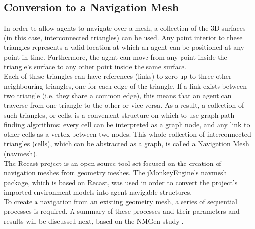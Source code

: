 \subsection{Conversion to a Navigation Mesh}
In order to allow agents to navigate over a mesh, a collection of the 3D surfaces (in this case, interconnected triangles) can be used. Any point interior to these triangles represents a valid location at which an agent can be positioned at any point in time. Furthermore, the agent can move from any point inside the triangle's surface to any other point inside the same surface.\\
Each of these triangles can have references (links) to zero up to three other neighbouring triangles, one for each edge of the triangle. If a link exists between two triangle (i.e. they share a common edge), this means that an agent can traverse from one triangle to the other or vice-versa. As a result, a collection of such triangles, or cells, is a convenient structure on which to use graph path-finding algorithms: every cell can be interpreted as a graph node, and any link to other cells as a vertex between two nodes. This whole collection of interconnected triangles (cells), which can be abstracted as a graph, is called a Navigation Mesh (navmesh).\\
The Recast\cite{Recast} project is an open-source tool-set focused on the creation of navigation meshes from geometry meshes. The jMonkeyEngine's navmesh package, which is based on Recast, was used in order to convert the project's imported environment models into agent-navigable structures.\\
To create a navigation from an existing geometry mesh, a series of sequential processes is required. A summary of these processes and their parameters and results will be discussed next, based on the NMGen study \cite{NMGen}.
